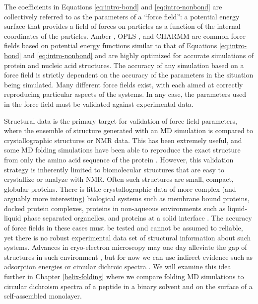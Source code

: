 The coefficients in Equations \ref{eq:intro-bond} and \ref{eq:intro-nonbond} are collectively referred to as the parameters of a ``force field'': a potential energy surface that provides a field of forces on particles as a function of the internal coordinates of the particles. 
Amber \cite{Duan2003}, OPLS \cite{Jorgensen1996, Kaminski2001}, and CHARMM \cite{Best2012} are common force fields based on potential energy functions similar to that of Equations \ref{eq:intro-bond} and \ref{eq:intro-nonbond} and are highly optimized for accurate simulations of protein and nucleic acid structures. 
The accuracy of any simulation based on a force field is strictly dependent on the accuracy of the parameters in the situation being simulated. 
Many different force fields exist, with each aimed at correctly reproducing particular aspects of the systems. 
In any case, the parameters used in the force field must be validated against experimental data. 

Structural data is the primary target for validation of force field parameters, where the ensemble of structure generated with an MD simulation is compared to crystallographic structures or NMR data. 
This has been extremely useful, and some MD folding simulations have been able to reproduce the exact structure from only the amino acid sequence of the protein \cite{Duan1998, Lindorff-Larsen2011, Bowman2011, Voelz2012, Shaw2010, Lane2013, Koukos2014}. 
However, this validation strategy is inherently limited to biomolecular structures that are easy to crystallize or analyze with NMR.
Often such structures are small, compact, globular proteins. 
There is little crystallographic data of more complex (and arguably more interesting) biological systems such as membrane bound proteins, docked protein complexes, proteins in non-aqueous environments such as liquid-liquid phase separated organelles, and proteins at a solid interface \cite{Berman2013}. 
The accuracy of force fields in these cases must be tested and cannot be assumed to reliable, yet there is no robust experimental data set of structural information about such systems. 
Advances in cryo-electron microscopy may one day alleviate the gap of structures in such environment \cite{Murata2018}, but for now we can use indirect evidence such as adsorption energies\cite{Latour2002, Raut2005, Abramyan2015} or circular dichroic spectra \cite{Holzwarth1965, Woody1967, Johnson1988, Berova2000circular, Kelly2005}.
We will examine this idea further in Chapter \ref{helix-folding} where we compare folding MD simulations to circular dichroism spectra of a peptide in a binary solvent and on the surface of a self-assembled monolayer. 

